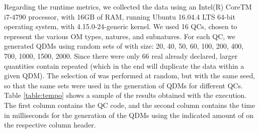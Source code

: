 
Regarding the runtime metrics, we collected the data using an Intel(R) Core{TM} i7-4790 processor, 
with 16GB of RAM, running Ubuntu 16.04.4 LTS 64-bit operating system, with 4.15.0-24-generic kernel. We used 16 QCs, 
chosen to represent the various OM types, natures, and subnatures. For each QC, we generated QDMs using 
random sets of \callers with size: 20, 40, 50, 60, 100, 200, 400, 700, 1000, 1500, 2000. 
Since there were only 66 real \callers already declared, larger quantities contain repeated \callers (which in the end will duplicate 
the data within a given QDM). The selection of \callers was performed at random, but with the same seed, so that the same sets were used in the 
generation of QDMs for different QCs. Table \ref{table:tempo} shows a sample of the results obtained with the execution. 
The first column contains the QC code, and the second column contains the time in milliseconds for the generation of 
the QDMs using the indicated amount of \callers on the respective column header.


